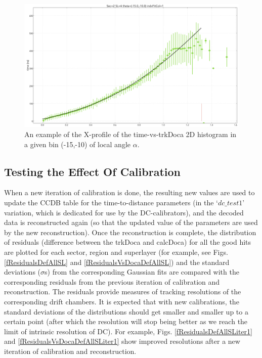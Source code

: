 \documentclass[12pt,epsfig]{article}
\begin{document}
\begin{figure}
    \centering
    \includegraphics[width=1.0\textwidth]{Figures/time_vs_trkDocaXProfileExample_Sec2_SL4_th_m15_m10withFit.png}
    \caption{An example of the X-profile of  the time-vs-trkDoca 2D histogram in a given bin (-15,-10) of local angle $\alpha$.}
    \label{fTimeVsTrkDocaXProfileWithFit}
\end{figure}



\subsection{Testing the Effect Of Calibration}
When a new iteration of calibration is done, the resulting new values are used to update the CCDB table for the time-to-distance parameters (in the `$dc\_test1$' variation, which is dedicated for use by the DC-calibrators), and the decoded data is reconstructed again (so that the updated value of the parameters are used by the new reconstruction). Once the reconstruction is complete, the distribution of residuals (difference between the trkDoca and calcDoca) for all the good hits are plotted for each sector, region and superlayer (for example, see Figs. \ref{fResidualsDefAllSL} and \ref{fResidualsVsDocaDefAllSL}) and the standard deviations ($\sigma$s) from the corresponding Gaussian fits are compared with the corresponding residuals from the previous iteration of calibration and reconstruction. The residuals provide measures of tracking resolutions of the corresponding drift chambers. It is expected that with new calibrations, the standard deviations of the distributions should get smaller and smaller up to a certain point (after which the resolution will stop being better as we reach the limit of intrinsic resolution of DC). For example, Figs.  \ref{fResidualsDefAllSLiter1} and \ref{fResidualsVsDocaDefAllSLiter1} show improved resolutions after a new iteration of calibration and reconstruction.
\end{document}
